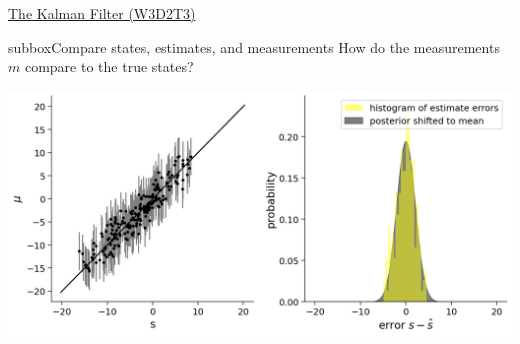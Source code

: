 \begin{textbox}{\href{http://instructor.compneuro.neuromatch.io/tutorials/W3D2_HiddenDynamics/instructor/W3D2_Tutorial3.html}{The Kalman Filter (W3D2T3)}   }
\begin{subbox}{subbox}{Compare states, estimates, and measurements}
How do the measurements $m$ compare to the true states?


\begin{center}
    
\includegraphics[scale=0.27]{Figures/HD/HD_Figure8.png}
\end{center}

\end{subbox}
\end{textbox}

